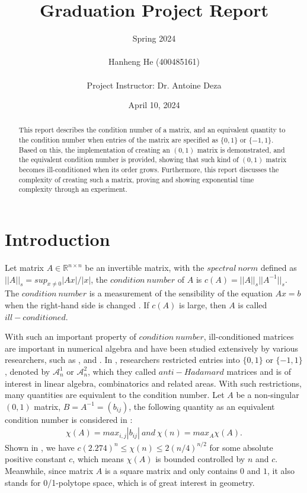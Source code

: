 \documentclass[11pt]{article}
\title{\textbf{ Graduation Project Report }}
\author{Spring 2024 \\ \\ Hanheng He (400485161) \\ \\ Project Instructor: Dr. Antoine Deza }
\date{April 10, 2024}
\begin{document}
\maketitle

\pagestyle{fancy}

\begin{abstract}
    This report describes the condition number of a matrix, and an equivalent quantity to the condition number when entries of the matrix are specified as $\{0, 1\}$ or $\{-1, 1\}$. Based on this, the implementation of creating an $(0, 1)$ matrix is demonstrated, and the equivalent condition number is provided, showing that such kind of $(0, 1)$ matrix becomes ill-conditioned when its order grows. Furthermore, this report discusses the complexity of creating such a matrix, proving and showing exponential time complexity through an experiment.
\end{abstract}
\tableofcontents



\pagebreak
\section{Introduction}

Let matrix $A \in \mathbb{R}^{n\times n}$ be an invertible matrix, with the $spectral \ norm$ defined as $||A||_s = sup_{x\neq0}|Ax|/|x|$, the $condition\ number$ of $A$ is $c(A) = ||A||_s||A^{-1}||_s$. The $condition\ number$ is a measurement of the sensibility of the equation $Ax = b$ when the right-hand side is changed \cite{ALON1997133}. If $c(A)$ is large, then $A$ is called $ill-conditioned$.

With such an important property of $condition\ number$, ill-conditioned matrices are important in numerical algebra and have been studied extensively by various researchers, such as \cite{doi:10.1137/1018113}, \cite{wilkinson1972note} and \cite{neumaier1998solving}. In \cite{GRAHAM1984113}, researchers restricted entries into $\{0, 1\}$ or $\{-1, 1\}$, denoted by $\mathcal{A}_n^1$ or $\mathcal{A}_n^2$, which they called $anti-Hadamard$ matrices and is of interest in linear algebra, combinatorics and related areas. With such restrictions, many quantities are equivalent to the condition number. Let $A$ be a non-singular $(0, 1)$ matrix, $B = A^{-1} = (b_{ij})$, the following quantity as an equivalent condition number is considered in \cite{GRAHAM1984113}:
\begin{align*}
\chi(A) = max_{i, j}|b_{ij}|\ and\ \chi(n) = max_A \chi(A).
\end{align*}
Shown in \cite{GRAHAM1984113}, we have $c(2.274)^n \leq \chi(n) \leq 2(n/4)^{n/2}$ for some absolute positive constant $c$, which means $\chi(A)$ is bounded controlled by $n$ and $c$. Meanwhile, since matrix $A$ is a square matrix and only contains $0$ and $1$, it also stands for 0/1-polytope space, which is of great interest in geometry.
\end{document}
